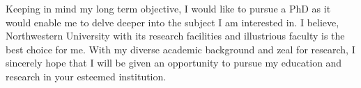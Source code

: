 \documentclass[12pt,a4paper,oneside]{amsart}
\begin{document}
Keeping in mind my long term objective, I would like to pursue a PhD as it would enable me to delve deeper into the subject I am interested in. I believe, Northwestern University with its research facilities and illustrious faculty is the best choice for me. With my diverse academic background and zeal for research, I sincerely hope that I will be given an opportunity to pursue my education and research in your esteemed institution.
\end{document}
